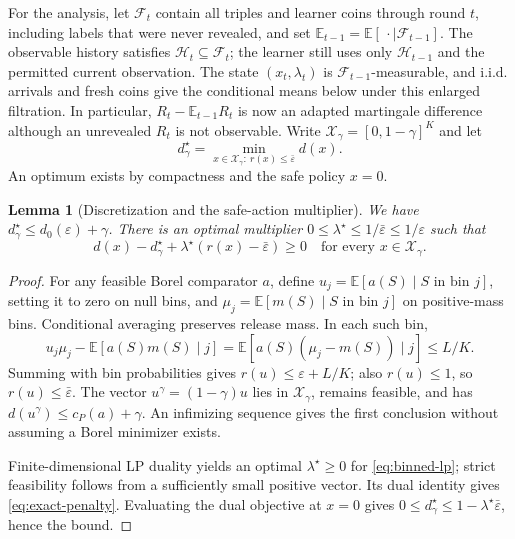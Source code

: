\documentclass[11pt]{article}
\newtheorem{lemma}[theorem]{Lemma}
\theoremstyle{remark}
\newcommand{\E}{\mathbb E}
\newcommand{\calH}{\mathcal H}
\newcommand{\calF}{\mathcal F}
\newcommand{\eps}{\varepsilon}
\begin{document}
For the analysis, let $\calF_t$ contain all triples and learner coins
through round $t$, including labels that were never revealed, and set
$\E_{t-1}=\E[\,\cdot\mid\calF_{t-1}]$. The observable history
satisfies $\calH_t\subseteq\calF_t$; the learner still uses only
$\calH_{t-1}$ and the permitted current observation. The state
$(x_t,\lambda_t)$ is $\calF_{t-1}$-measurable, and i.i.d. arrivals
and fresh coins give the conditional means below under this enlarged
filtration. In particular, $R_t-\E_{t-1}R_t$ is now an adapted
martingale difference although an unrevealed $R_t$ is not observable.
Write $\mathcal X_\gamma=[0,1-\gamma]^K$ and let
\begin{equation}
 d_\gamma^\star=\min_{x\in\mathcal X_\gamma:\ r(x)\le\bar\eps}d(x).
 \label{eq:binned-lp}
\end{equation}
An optimum exists by compactness and the safe policy $x=0$.

\begin{lemma}[Discretization and the safe-action multiplier]
\label{lem:coarsening}
We have $d_\gamma^\star\le d_0(\eps)+\gamma$. There is an optimal
multiplier $0\le\lambda^\star\le1/\bar\eps\le1/\eps$ such that
\begin{equation}
 d(x)-d_\gamma^\star+\lambda^\star(r(x)-\bar\eps)\ge0
 \quad\text{for every }x\in\mathcal X_\gamma.
 \label{eq:exact-penalty}
\end{equation}
\end{lemma}
\begin{proof}
For any feasible Borel comparator $a$, define
$u_j=\E[a(S)\mid S\text{ in bin }j]$, setting it to zero on null bins,
and $\mu_j=\E[m(S)\mid S\text{ in bin }j]$ on positive-mass bins.
Conditional averaging preserves release mass. In each such bin,
\[
 u_j\mu_j-\E[a(S)m(S)\mid j]
 =\E[a(S)(\mu_j-m(S))\mid j]\le L/K.
\]
Summing with bin probabilities gives $r(u)\le\eps+L/K$; also
$r(u)\le1$, so $r(u)\le\bar\eps$. The vector
$u^\gamma=(1-\gamma)u$ lies in $\mathcal X_\gamma$, remains feasible,
and has $d(u^\gamma)\le c_P(a)+\gamma$. An infimizing sequence gives
the first conclusion without assuming a Borel minimizer exists.

Finite-dimensional LP duality yields an optimal $\lambda^\star\ge0$
for \eqref{eq:binned-lp}; strict feasibility follows from a sufficiently
small positive vector. Its dual identity gives \eqref{eq:exact-penalty}.
Evaluating the dual objective at $x=0$ gives
$0\le d_\gamma^\star\le1-\lambda^\star\bar\eps$, hence the bound.
\end{proof}
\end{document}
